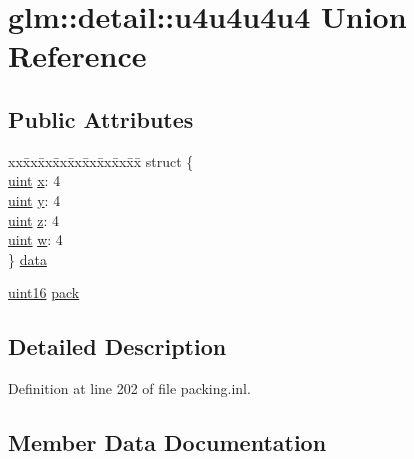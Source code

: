 \hypertarget{unionglm_1_1detail_1_1u4u4u4u4}{}\section{glm\+::detail\+::u4u4u4u4 Union Reference}
\label{unionglm_1_1detail_1_1u4u4u4u4}
\subsection*{Public Attributes}
\begin{DoxyCompactItemize}
\item 
\begin{tabbing}
xx\=xx\=xx\=xx\=xx\=xx\=xx\=xx\=xx\=\kill
struct \{\\
\>\mbox{\hyperlink{group__core__precision_ga4fd29415871152bfb5abd588334147c8}{uint}} \mbox{\hyperlink{unionglm_1_1detail_1_1u4u4u4u4_a41dd5af8fc599a451d74967a2c97e750}{x}}: 4\\
\>\mbox{\hyperlink{group__core__precision_ga4fd29415871152bfb5abd588334147c8}{uint}} \mbox{\hyperlink{unionglm_1_1detail_1_1u4u4u4u4_a1c5a971d31d261db43863e8e95d81ecb}{y}}: 4\\
\>\mbox{\hyperlink{group__core__precision_ga4fd29415871152bfb5abd588334147c8}{uint}} \mbox{\hyperlink{unionglm_1_1detail_1_1u4u4u4u4_a1635b8d41a367114239565da102ad6b9}{z}}: 4\\
\>\mbox{\hyperlink{group__core__precision_ga4fd29415871152bfb5abd588334147c8}{uint}} \mbox{\hyperlink{unionglm_1_1detail_1_1u4u4u4u4_a7a6644d1d5c02008e670d714d26124af}{w}}: 4\\
\} \mbox{\hyperlink{unionglm_1_1detail_1_1u4u4u4u4_a138b91238bde678b330a15f1a02dc4a8}{data}}\\

\end{tabbing}\item 
\mbox{\hyperlink{namespaceglm_1_1detail_a47b2a7d006d187338e8031a352d1ce56}{uint16}} \mbox{\hyperlink{unionglm_1_1detail_1_1u4u4u4u4_aa989a8fab51b41be68d0d07147fba3b8}{pack}}
\end{DoxyCompactItemize}


\subsection{Detailed Description}


Definition at line 202 of file packing.\+inl.



\subsection{Member Data Documentation}
\mbox{\label{unionglm_1_1detail_1_1u4u4u4u4_a138b91238bde678b330a15f1a02dc4a8}} 
